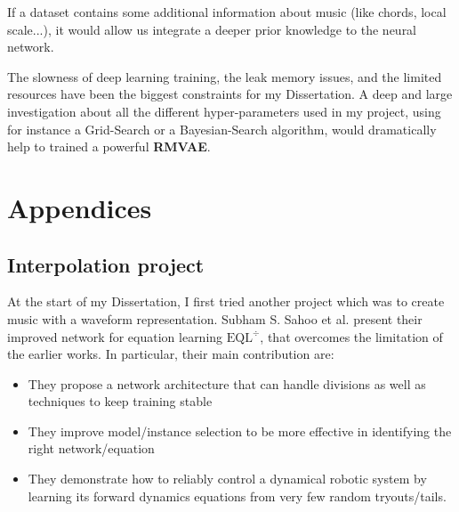 \documentclass[12pt]{report}
\begin{document}
If a dataset contains some additional information about music (like chords, local scale...), it would allow us integrate a deeper prior knowledge to the neural network.

The slowness of deep learning training, the leak memory issues, and the limited resources have been the biggest constraints for my Dissertation.
A deep and large investigation about all the different hyper-parameters used in my project, using for instance a Grid-Search or a Bayesian-Search algorithm, would dramatically help to trained a powerful \textbf{RMVAE}.


\newpage





\newpage

\chapter*{Appendices}
\appendix

\section{Interpolation project}

At the start of my Dissertation, I first tried another project which was to create music with a waveform representation.
Subham S. Sahoo et al. \cite{sahoo_learning_2018} present their improved network for equation learning $\text{EQL}^\div$, that overcomes the limitation of the earlier works. In particular, their main contribution are:
\begin{itemize}
    \item They propose a network architecture that can handle divisions as well as techniques to keep training stable
    \item They improve model/instance selection to be more effective in identifying the right network/equation
    \item They demonstrate how to reliably control a dynamical robotic system by learning its forward dynamics equations from very few random tryouts/tails.
\end{itemize}
\end{document}
